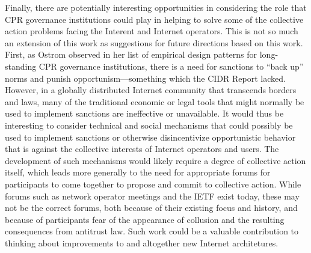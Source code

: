 Finally, there are potentially interesting opportunities in considering the
role that CPR governance institutions could play in helping to solve some of
the collective action problems facing the Interent and Internet operators. This
is not so much an extension of this work as suggestions for future directions
based on this work. First, as Ostrom observed in her list of empirical design
patterns for long-standing CPR governance institutions, there is a need for
sanctions to ``back up'' norms and punish opportunism---something which the
CIDR Report lacked. However, in a globally distributed Internet community that
transcends borders and laws, many of the traditional economic or legal tools
that might normally be used to implement sanctions are ineffective or
unavailable. It would thus be interesting to consider technical and social
mechanisms that could possibly be used to implement sanctions or otherwise
disincentivize opportunistic behavior that is against the collective interests
of Internet operators and users. The development of such mechanisms would
likely require a degree of collective action itself, which leads more generally
to the need for appropriate forums for participants to come together to propose
and commit to collective action. While forums such as network operator meetings
and the IETF exist today, these may not be the correct forums, both because of
their existing focus and history, and because of participants fear of the
appearance of collusion and the resulting consequences from antitrust law.
Such work could be a valuable contribution to thinking about improvements to
and altogether new Internet architetures.







